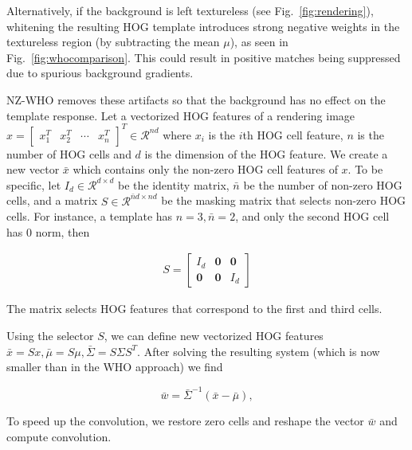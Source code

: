 Alternatively, if the background is left textureless (see
Fig.~\ref{fig:rendering}), whitening the resulting HOG template introduces strong negative weights in the textureless region (by
subtracting the mean $\mu$), as seen in Fig.~\ref{fig:whocomparison}.
This could result in positive matches being suppressed due to spurious
background gradients.

NZ-WHO removes these artifacts so that the background has no effect on the
template response. Let a vectorized HOG features of a rendering image $x = [
\begin{array}{ccccc}x_1^T & x_2^T & \cdots & x_n^T\end{array} ]^T \in
\mathcal{R}^{nd}$ where $x_i$ is the $i$th HOG cell feature, $n$ is the
number of HOG cells and $d$ is the dimension of the HOG feature. We create a new
vector $\bar{x}$ which contains only the non-zero HOG cell features of $x$. To be
specific, let $I_d\in \mathcal{R}^{d\times d}$ be the identity matrix, $\bar{n}$ be
the number of non-zero HOG cells, and a matrix $S\in \mathcal{R}^{\bar{n}d \times
    nd}$ be the masking matrix that selects non-zero HOG cells. For instance, a
template has  $n=3, \bar{n}=2$, and only the second HOG cell has $0$ norm, then

\begin{align}
    S = \left[ \begin{array}{ccc}
        I_d & \mathbf{0} & \mathbf{0}\\
        \mathbf{0} & \mathbf{0} & I_d
        \end{array} \right]
\end{align}

The matrix selects HOG features that correspond to the first and third cells. 

Using the selector $S$, we can define new vectorized HOG features $\bar{x} = S x,
\bar{\mu} = S\mu, \bar{\Sigma} = S \Sigma S^T$. After solving the resulting system (which
is now smaller than in the WHO approach) we find

\begin{equation}
    \bar{w}=\bar{\Sigma}^{-1}(\bar{x} - \bar{\mu}) \label{eq:nz-who},
\end{equation}

To speed up the convolution, we restore zero cells and reshape the vector $\bar{w}$
and compute convolution.


